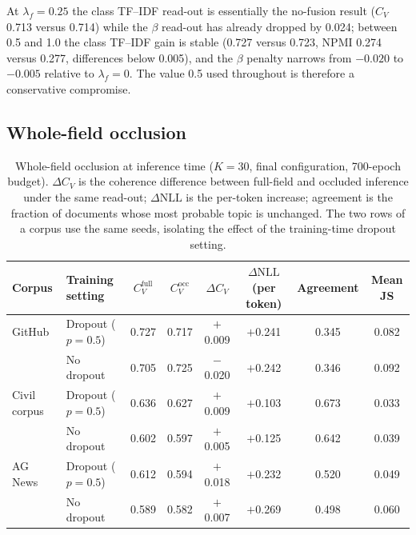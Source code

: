 \documentclass[Journal,letterpaper]{ascelike-new}
\begin{document}
At $\lambda_f=0.25$ the class TF--IDF read-out is essentially the no-fusion result ($C_V$ 0.713
versus 0.714) while the $\beta$ read-out has already dropped by 0.024; between 0.5 and 1.0 the
class TF--IDF gain is stable (0.727 versus 0.723, NPMI 0.274 versus 0.277, differences below
0.005), and the $\beta$ penalty narrows from $-0.020$ to $-0.005$ relative to $\lambda_f=0$.
The value 0.5 used throughout is therefore a conservative compromise.

\subsection{Whole-field occlusion}

\begin{table}[t]
\centering
\caption{Whole-field occlusion at inference time ($K=30$, final configuration, 700-epoch budget). $\Delta C_V$ is the coherence difference between full-field and occluded inference under the same read-out; $\Delta\mathrm{NLL}$ is the per-token increase; agreement is the fraction of documents whose most probable topic is unchanged. The two rows of a corpus use the same seeds, isolating the effect of the training-time dropout setting.}
\label{tab:occlusion}
\small
\setlength{\tabcolsep}{4pt}
\begin{tabular}{llcccccc}
\toprule
Corpus & Training setting & $C_V^{\mathrm{full}}$ & $C_V^{\mathrm{occ}}$ & $\Delta C_V$
 & $\Delta\mathrm{NLL}$(per token) & Agreement & Mean JS \\
\midrule
GitHub & Dropout ($p=0.5$) & 0.727 & 0.717 & $+$0.009 & $+$0.241 & 0.345 & 0.082 \\
       & No dropout & 0.705 & 0.725 & $-$0.020 & $+$0.242 & 0.346 & 0.092 \\
\midrule
Civil corpus & Dropout ($p=0.5$) & 0.636 & 0.627 & $+$0.009 & $+$0.103 & 0.673 & 0.033 \\
        & No dropout & 0.602 & 0.597 & $+$0.005 & $+$0.125 & 0.642 & 0.039 \\
\midrule
AG News & Dropout ($p=0.5$) & 0.612 & 0.594 & $+$0.018 & $+$0.232 & 0.520 & 0.049 \\
        & No dropout & 0.589 & 0.582 & $+$0.007 & $+$0.269 & 0.498 & 0.060 \\
\bottomrule
\end{tabular}
\end{table}
\end{document}
